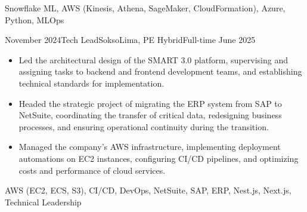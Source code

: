 \begin{experiences}
{{\begin{itemize}
      \end{itemize}
    }
  }
  {Snowflake ML, {AWS (Kinesis, Athena, SageMaker, CloudFormation)}, Azure, Python, MLOps}

\experience
  {November 2024}{Tech Lead}{Sokso}{Lima, PE}
  {Hybrid}{Full-time}
  {June 2025} {
    \begin{itemize}
      \item Led the architectural design of the SMART 3.0 platform, supervising and assigning tasks to backend and frontend development teams, and establishing technical standards for implementation.
      \item Headed the strategic project of migrating the ERP system from SAP to NetSuite, coordinating the transfer of critical data, redesigning business processes, and ensuring operational continuity during the transition.
      \item Managed the company's AWS infrastructure, implementing deployment automations on EC2 instances, configuring CI/CD pipelines, and optimizing costs and performance of cloud services.
    \end{itemize}
  }
  {{AWS (EC2, ECS, S3)}, CI/CD, DevOps, NetSuite, SAP, ERP, Nest.js, Next.js, Technical Leadership}


\end{experiences}
